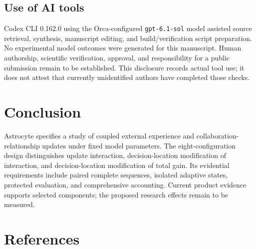 \documentclass[
  english,
  11pt,
]{article}
\begin{document}
\subsection{Use of AI tools}\label{use-of-ai-tools}

Codex CLI 0.162.0 using the Orca-configured \texttt{gpt-6.1-sol} model
assisted source retrieval, synthesis, manuscript editing, and
build/verification script preparation. No experimental model outcomes
were generated for this manuscript. Human authorship, scientific
verification, approval, and responsibility for a public submission
remain to be established. This disclosure records actual tool use; it
does not attest that currently unidentified authors have completed those
checks.

\section{Conclusion}\label{conclusion}

Astrocyte specifies a study of coupled external experience and
collaboration-relationship updates under fixed model parameters. The
eight-configuration design distinguishes update interaction,
decision-location modification of interaction, and decision-location
modification of total gain. Its evidential requirements include paired
complete sequences, isolated adaptive states, protected evaluation, and
comprehensive accounting. Current product evidence supports selected
components; the proposed research effects remain to be measured.

\section{References}\label{references}
\end{document}
